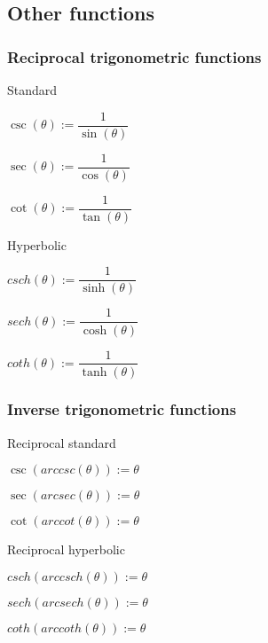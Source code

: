
\subsection{Other functions}

\subsubsection{Reciprocal trigonometric functions}

Standard

\(\csc (\theta ):=\dfrac{1}{\sin (\theta )}\)

\(\sec (\theta ):=\dfrac{1}{\cos (\theta )}\)

\(\cot (\theta ):=\dfrac{1}{\tan (\theta )}\)

Hyperbolic

\(csch (\theta ):=\dfrac{1}{\sinh (\theta )}\)

\(sech (\theta ):=\dfrac{1}{\cosh (\theta )}\)

\(coth (\theta ):=\dfrac{1}{\tanh (\theta )}\)

\subsubsection{Inverse trigonometric functions}

Reciprocal standard

\(\csc (arccsc (\theta )):=\theta \)

\(\sec (arcsec (\theta )):=\theta \)

\(\cot (arccot (\theta )):=\theta \)

Reciprocal hyperbolic

\(csch (arccsch (\theta )):=\theta \)

\(sech (arcsech (\theta )):=\theta \)

\(coth (arccoth (\theta )):=\theta \)

